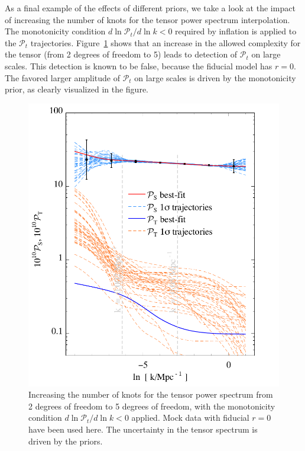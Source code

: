 \documentclass[a4paper,11pt]{article}
\newcommand{\ptensor}{{\mathcal{P}_t}}
\begin{document}
As a final example of the effects of different priors, we take a look
at the impact of increasing the number of knots for the tensor power
spectrum interpolation. The monotonicity condition $d\ln \ptensor/d\ln
k<0$ required by inflation is applied to the $\ptensor$ trajectories.
Figure~\ref{fig:7knot_Ps_5knot_Pt} shows that an increase in the
allowed complexity for the tensor (from 2 degrees of freedom to 5)
leads to detection of $\ptensor$ on large scales.  This detection is
known to be false, because the fiducial model has $r=0$.  The favored
larger amplitude of $\ptensor$ on large scales is driven by the
monotonicity prior, as clearly visualized in the figure.

\begin{figure}
  \includegraphics[width=0.9\linewidth]{fc_p7p5hermite_traj11}
  \caption{Increasing the number of knots for the tensor power
  spectrum from 2 degrees of freedom to 5 degrees of freedom, with the
  monotonicity condition $d\ln \ptensor/d\ln k<0$ applied. Mock data
  with fiducial $r=0$ have been used here. The uncertainty in the
  tensor spectrum is driven by the priors.}
  \label{fig:7knot_Ps_5knot_Pt}
\end{figure}
\end{document}

